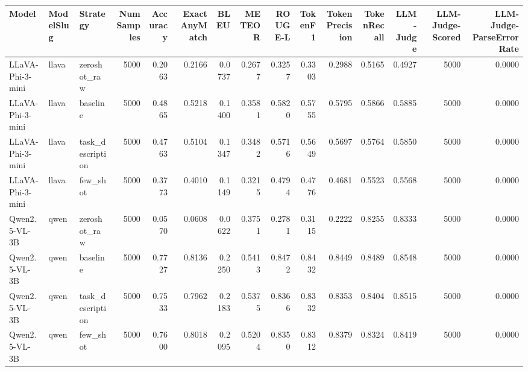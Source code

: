 \begin{tabular}{lllrrrrrrrrrrrr}
\toprule
Model & ModelSlug & Strategy & NumSamples & Accuracy & ExactAnyMatch & BLEU & METEOR & ROUGE-L & TokenF1 & TokenPrecision & TokenRecall & LLM-Judge & LLM-Judge-Scored & LLM-Judge-ParseErrorRate \\
\midrule
LLaVA-Phi-3-mini & llava & zeroshot_raw & 5000 & 0.2063 & 0.2166 & 0.0737 & 0.2677 & 0.3257 & 0.3303 & 0.2988 & 0.5165 & 0.4927 & 5000 & 0.0000 \\
LLaVA-Phi-3-mini & llava & baseline & 5000 & 0.4865 & 0.5218 & 0.1400 & 0.3581 & 0.5820 & 0.5755 & 0.5795 & 0.5866 & 0.5885 & 5000 & 0.0000 \\
LLaVA-Phi-3-mini & llava & task_description & 5000 & 0.4763 & 0.5104 & 0.1347 & 0.3482 & 0.5716 & 0.5649 & 0.5697 & 0.5764 & 0.5850 & 5000 & 0.0000 \\
LLaVA-Phi-3-mini & llava & few_shot & 5000 & 0.3773 & 0.4010 & 0.1149 & 0.3215 & 0.4794 & 0.4776 & 0.4681 & 0.5523 & 0.5568 & 5000 & 0.0000 \\
Qwen2.5-VL-3B & qwen & zeroshot_raw & 5000 & 0.0570 & 0.0608 & 0.0622 & 0.3751 & 0.2781 & 0.3115 & 0.2222 & 0.8255 & 0.8333 & 5000 & 0.0000 \\
Qwen2.5-VL-3B & qwen & baseline & 5000 & 0.7727 & 0.8136 & 0.2250 & 0.5413 & 0.8472 & 0.8432 & 0.8449 & 0.8489 & 0.8548 & 5000 & 0.0000 \\
Qwen2.5-VL-3B & qwen & task_description & 5000 & 0.7533 & 0.7962 & 0.2183 & 0.5375 & 0.8366 & 0.8332 & 0.8353 & 0.8404 & 0.8515 & 5000 & 0.0000 \\
Qwen2.5-VL-3B & qwen & few_shot & 5000 & 0.7600 & 0.8018 & 0.2095 & 0.5204 & 0.8350 & 0.8312 & 0.8379 & 0.8324 & 0.8419 & 5000 & 0.0000 \\
\bottomrule
\end{tabular}
